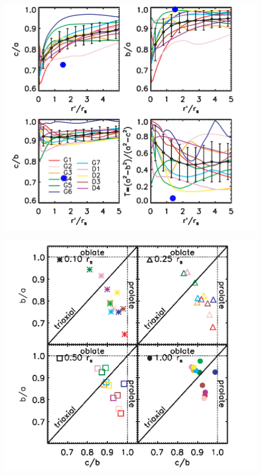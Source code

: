 \documentclass[12pt]{article}
\begin{document}
\begin{figure}[H]
\centering
\includegraphics[scale=0.5]{hayashimod.png}
\end{figure}

\begin{figure}[H]
\centering
\includegraphics[scale=0.5]{prolateoblatehayashi.png}
\end{figure}
\end{document}
